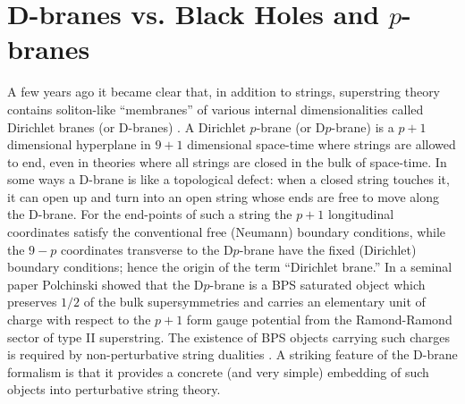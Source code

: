 \documentclass[12pt]{article}
\begin{document}
\section{D-branes vs. Black Holes and $p$-branes}

A few years ago it became clear that, 
in addition to strings, superstring theory
contains soliton-like ``membranes'' of various internal dimensionalities
called Dirichlet branes (or D-branes) \cite{Dnotes}.
A Dirichlet $p$-brane (or D$p$-brane) is a $p+1$ dimensional hyperplane
in $9+1$ dimensional space-time where strings are allowed to end,
even in theories where all strings are closed in the bulk of space-time.
In some ways a D-brane is like a topological defect: when a closed string
touches it, it can open up and turn into an open string whose
ends are free to move along the D-brane. For the end-points of such a string
the $p+1$ longitudinal coordinates satisfy the conventional free (Neumann)
boundary conditions, while the $9-p$ coordinates transverse to
the D$p$-brane have the fixed (Dirichlet) boundary conditions; hence
the origin of the term ``Dirichlet brane.'' 
In a seminal paper \cite{brane} Polchinski
showed that the D$p$-brane is a BPS saturated object which preserves
$1/2$ of the bulk supersymmetries and carries an elementary unit
of charge with respect to the $p+1$ form gauge potential from the
Ramond-Ramond sector of type II superstring. The existence of BPS
objects carrying such charges is required by non-perturbative string
dualities \cite{HullT}. A striking feature of the D-brane formalism 
is that it provides a
concrete (and very simple) embedding of such objects into perturbative
string theory.
\end{document}
